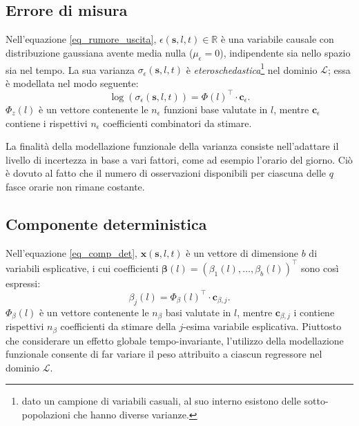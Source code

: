 \subsection[Errore di misura]{Errore di misura}
Nell'equazione \ref{eq_rumore_uscita}, $\epsilon (\mathbf{s}, l, t)\in\mathbb{R}$ è una variabile causale con distribuzione gaussiana avente media nulla ($\mu_\epsilon = 0$), indipendente sia nello spazio sia nel tempo. La sua varianza $\sigma_\epsilon(\mathbf{s}, l, t)$ è \textit{eteroschedastica}\footnote{dato un campione di variabili casuali, al suo interno esistono delle sotto-popolazioni che hanno diverse varianze.} nel dominio $\mathcal{L}$; essa è modellata nel modo seguente:
\[
	\log(\sigma_\epsilon(\mathbf{s}, l, t)) = \Phi(l)^\top\cdot\mathbf{c}_\epsilon.
\]
$\Phi_z(l)$ è un vettore contenente le $n_\epsilon$ funzioni base valutate in $l$, mentre $\mathbf{c}_\epsilon$ contiene i rispettivi $n_\epsilon$ coefficienti combinatori da stimare. \par La finalità della modellazione funzionale della varianza consiste nell'adattare il livello di incertezza in base a vari fattori, come ad esempio l'orario del giorno. Ciò è dovuto al fatto che il numero di osservazioni disponibili per ciascuna delle $q$ fasce orarie non rimane costante.

\subsection[Componente deterministica]{Componente deterministica}
Nell'equazione \ref{eq_comp_det}, $\mathbf{x}(\mathbf{s}, l, t)$ è un vettore di dimensione $b$ di variabili esplicative, i cui coefficienti $\boldsymbol{\beta}(l) = (\beta_1(l),\dots,\beta_b(l))^\top$ sono così espressi:
\[
	\beta_j(l) = \Phi_\beta(l)^\top\cdot\mathbf{c}_{\beta, j}.
\]
$\Phi_\beta(l)$ è un vettore contenente le $n_\beta$ basi valutate in $l$, mentre $\mathbf{c}_{\beta, j}$ i contiene rispettivi $n_\beta$ coefficienti da stimare della $j$-esima variabile esplicativa. Piuttosto che considerare un effetto globale tempo-invariante, l'utilizzo della modellazione funzionale consente di far variare il peso attribuito a ciascun regressore nel dominio $\mathcal{L}$.

